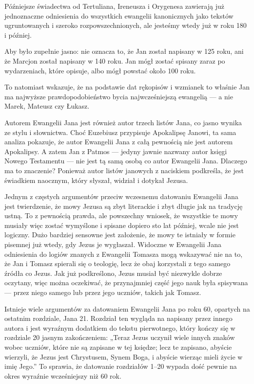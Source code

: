 Późniejsze świadectwa od Tertuliana, Ireneusza i Orygenesa zawierają już jednoznaczne odniesienia do wszystkich ewangelii kanonicznych jako tekstów ugruntowanych i szeroko rozpowszechnionych, ale jesteśmy wtedy już w roku 180 i później.

Aby było zupełnie jasno: nie oznacza to, że Jan został napisany w 125 roku, ani że Marcjon został napisany w 140 roku.
Jan mógł zostać spisany zaraz po wydarzeniach, które opisuje, albo mógł powstać około 100 roku.

To natomiast wskazuje, że na podstawie dat rękopisów i wzmianek to właśnie Jan ma najwyższe prawdopodobieństwo bycia najwcześniejszą ewangelią — a nie Marek, Mateusz czy Łukasz.

Autorem Ewangelii Jana jest również autor trzech listów Jana, co jasno wynika ze stylu i słownictwa.
Choć Euzebiusz przypisuje Apokalipsę Janowi, ta sama analiza pokazuje, że autor Ewangelii Jana z całą pewnością nie jest autorem Apokalipsy.
A zatem Jan z Patmos — jedyny jawnie nazwany autor księgi Nowego Testamentu — nie jest tą samą osobą co autor Ewangelii Jana.
Dlaczego ma to znaczenie?
Ponieważ autor listów janowych z naciskiem podkreśla, że jest świadkiem naocznym, który słyszał, widział i dotykał Jezusa.

Jednym z częstych argumentów przeciw wczesnemu datowaniu Ewangelii Jana jest twierdzenie, że mowy Jezusa są zbyt literackie i zbyt długie jak na tradycję ustną.
To z pewnością prawda, ale powszechny wniosek, że wszystkie te mowy musiały więc zostać wymyślone i spisane dopiero sto lat później, wcale nie jest logiczny.
Dużo bardziej sensowne jest założenie, że mowy te istniały w formie pisemnej już wtedy, gdy Jezus je wygłaszał.
Widoczne w Ewangelii Jana odniesienia do logiów znanych z Ewangelii Tomasza mogą wskazywać nie na to, że Jan i Tomasz spierali się o teologię, lecz że obaj korzystali z tego samego źródła co Jezus.
Jak już podkreślono, Jezus musiał być niezwykle dobrze oczytany, więc można oczekiwać, że przynajmniej część jego nauk była spisywana — przez niego samego lub przez jego uczniów, takich jak Tomasz.

Istnieje wiele argumentów za datowaniem Ewangelii Jana po roku 60, opartych na ostatnim rozdziale, Jana 21.
Rozdział ten wygląda na napisany przez innego autora i jest wyraźnym dodatkiem do tekstu pierwotnego, który kończy się w rozdziale 20 jasnym zakończeniem:
„Teraz Jezus uczynił wiele innych znaków wobec uczniów, które nie są zapisane w tej księdze;
lecz te zapisano, abyście wierzyli, że Jezus jest Chrystusem, Synem Boga, i abyście wierząc mieli życie w imię Jego.”
To sprawia, że datowanie rozdziałów 1–20 wypada dość pewnie na okres wyraźnie wcześniejszy niż 60 rok.

